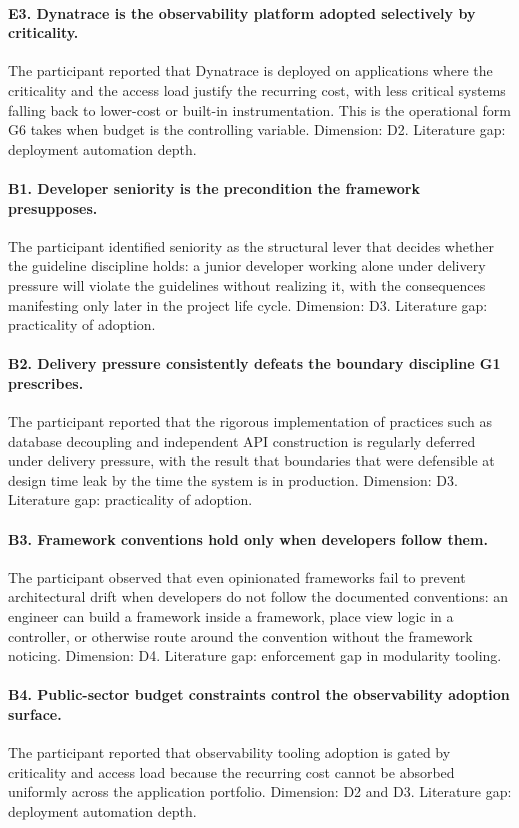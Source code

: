 \paragraph*{E3. Dynatrace is the observability platform adopted selectively by criticality.} The participant reported that Dynatrace is deployed on applications where the criticality and the access load justify the recurring cost, with less critical systems falling back to lower-cost or built-in instrumentation. This is the operational form G6 takes when budget is the controlling variable. Dimension: D2. Literature gap: deployment automation depth.

\paragraph*{B1. Developer seniority is the precondition the framework presupposes.} The participant identified seniority as the structural lever that decides whether the guideline discipline holds: a junior developer working alone under delivery pressure will violate the guidelines without realizing it, with the consequences manifesting only later in the project life cycle. Dimension: D3. Literature gap: practicality of adoption.

\paragraph*{B2. Delivery pressure consistently defeats the boundary discipline G1 prescribes.} The participant reported that the rigorous implementation of practices such as database decoupling and independent API construction is regularly deferred under delivery pressure, with the result that boundaries that were defensible at design time leak by the time the system is in production. Dimension: D3. Literature gap: practicality of adoption.

\paragraph*{B3. Framework conventions hold only when developers follow them.} The participant observed that even opinionated frameworks fail to prevent architectural drift when developers do not follow the documented conventions: an engineer can build a framework inside a framework, place view logic in a controller, or otherwise route around the convention without the framework noticing. Dimension: D4. Literature gap: enforcement gap in modularity tooling.

\paragraph*{B4. Public-sector budget constraints control the observability adoption surface.} The participant reported that observability tooling adoption is gated by criticality and access load because the recurring cost cannot be absorbed uniformly across the application portfolio. Dimension: D2 and D3. Literature gap: deployment automation depth.

